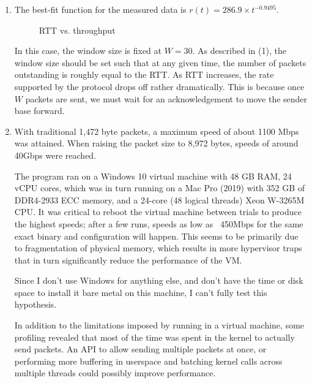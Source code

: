 \documentclass[11pt]{article}
\begin{document}
\begin{enumerate}
\item {
The best-fit function for the measured data is $r(t) = 286.9 \times t^{-0.9495}$.

\begin{figure}[H]
   \centering
{}

   \caption{RTT vs. throughput}
   \label{fig:rate-window}
\end{figure}

In this case, the window size is fixed at $W = 30$. As described in (1), the window size should be set such that at any given time, the number of packets outstanding is roughly equal to the RTT. As RTT increases, the rate supported by the protocol drops off rather dramatically. This is because once $W$ packets are sent, we must wait for an acknowledgement to move the sender base forward.
}

\item {
With traditional 1,472 byte packets, a maximum speed of about 1100 Mbps was attained. When raising the packet size to 8,972 bytes, speeds of around 40Gbps were reached.

The program ran on a Windows 10 virtual machine with 48 GB RAM, 24 vCPU cores, which was in turn running on a Mac Pro (2019) with 352 GB of DDR4-2933 ECC memory, and a 24-core (48 logical threads) Xeon W-3265M CPU. It was critical to reboot the virtual machine between trials to produce the highest speeds; after a few runs, speeds as low as ~450Mbps for the same exact binary and configuration will happen. This seems to be primarily due to fragmentation of physical memory, which results in more hypervisor traps that in turn significantly reduce the performance of the VM. 

Since I don't use Windows for anything else, and don't have the time or disk space to install it bare metal on this machine, I can't fully test this hypothesis.

In addition to the limitations imposed by running in a virtual machine, some profiling revealed that most of the time was spent in the kernel to actually send packets. An API to allow sending multiple packets at once, or performing more buffering in userspace and batching kernel calls across multiple threads could possibly improve performance.

}
\end{enumerate}
\end{document}
